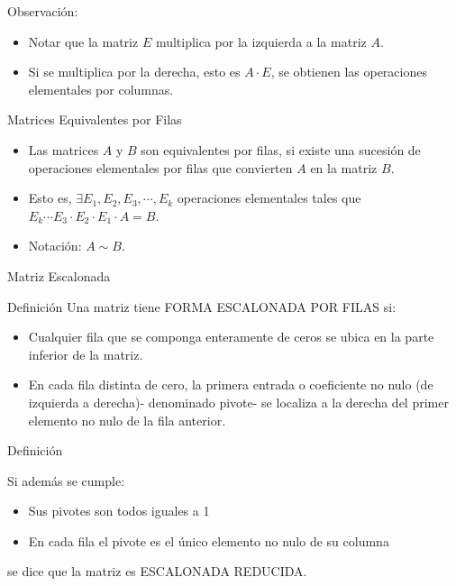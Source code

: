 \begin{block}{Observación:}
\begin{itemize}
\item
Notar que la matriz $E$ multiplica por la izquierda a la matriz  $A$.

\item
Si se multiplica por la derecha, esto es $ A\cdot E$, se obtienen las operaciones
elementales por columnas.

\end{itemize}
\end{block}


{Matrices  Equivalentes por Filas}

\begin{itemize}
\item
Las matrices $A$ y $B$ son equivalentes por filas, si existe una sucesión de  operaciones elementales por filas que convierten $A$ en la matriz  $B$.

\item
Esto es, $\exists E_1, E_2, E_3, \cdots,E_k$ operaciones elementales tales que
$E_k \cdots E_3 \cdot E_2 \cdot  E_1 \cdot A= B$.

\item
Notación:
$A\sim B$.
\end{itemize}


{Matriz Escalonada}

\begin{block}{Definición}
Una matriz tiene FORMA ESCALONADA POR FILAS si:
\begin{itemize}
\item
Cualquier fila que se componga enteramente de ceros se ubica en la parte inferior de la matriz.

\item
En cada fila distinta de cero, la primera entrada o coeficiente no nulo (de izquierda a derecha)- denominado pivote- se localiza a la derecha del primer elemento no nulo de la fila anterior.

\end{itemize}

\end{block}


\begin{block}{Definición}

Si además se cumple:

\begin{itemize}
\item
Sus pivotes son todos iguales a 1
\item
En cada fila el pivote es el único elemento no nulo de su columna
\end{itemize}

se dice que la matriz es ESCALONADA REDUCIDA.
\end{block}


